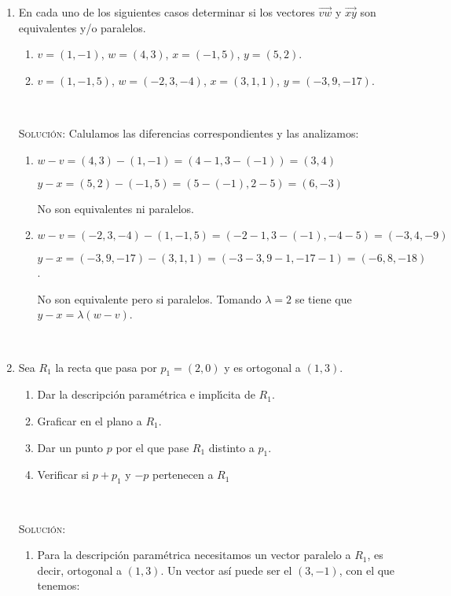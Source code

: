 \documentclass[a4paper,12pt,twoside,spanish,reqno]{amsbook}
\numberwithin{equation}{section}
\newcommand{\rta}{\noindent\textsc{Solución: }}
\begin{document}
\begin{enumerate}[resume]
 
\item En  cada uno de los siguientes casos determinar si los
vectores  $\overrightarrow{vw}$ y $\overrightarrow{xy}$ son
equivalentes y/o paralelos.
\begin{enumerate}
\item   $v=(1,-1)$,  $w=(4,3)$, $x=(-1,5)$, $y=(5,2)$. 
\item   $v=(1,-1,5)$,  $w=(-2,3,-4)$,  $x=(3,1,1)$,  $y=(-3,9,-17)$.
\end{enumerate}

\

\rta Calulamos las diferencias correspondientes y las analizamos:

\begin{enumerate}
\item $w - v = (4,3) - (1,-1) = (4-1,3-(-1)) = (3,4)$

$ y-x = (5,2) - (-1,5) = (5-(-1),2-5) = (6,-3)$

No son equivalentes ni paralelos.

\item $w-v = (-2,3,-4) - (1,-1,5) = (-2-1,3-(-1),-4-5) = (-3,4,-9)$

$ y-x = (-3,9,-17) - (3,1,1) = (-3-3,9-1,-17-1) = (-6,8,-18)$.

No son equivalente pero si paralelos. Tomando $\lambda=2$ se tiene que $y-x = \lambda (w-v)$.

\end{enumerate}

\

\item Sea $R_1$ la recta que pasa por $p_1=(2,0)$ y es ortogonal a $(1,3)$.
\begin{enumerate}
 \item Dar la descripci\'on param{\'e}trica e impl{\'\i}cita de $R_1$.
 \item Graficar en el plano a $R_1$.
 \item Dar un punto $p$ por el que pase $R_1$ distinto a $p_1$.
 \item Verificar si $p+p_1$ y $-p$ pertenecen a $R_1$
\end{enumerate}

\

\rta

\begin{enumerate}
 \item Para la descripción paramétrica necesitamos un vector paralelo a $R_1$, es decir, ortogonal a $(1,3)$. Un vector así puede ser el $(3,-1)$, con el que tenemos:
 

\end{enumerate}
\end{enumerate}
\end{document}
